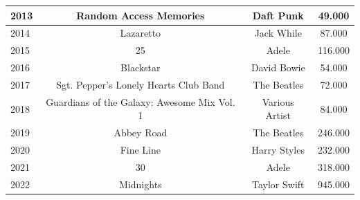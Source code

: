 \documentclass{article}
\begin{document}
\begin{table}[h]
{\begin{tabular}{|lccc|}
    \multicolumn{1}{|l|}{2013} & \multicolumn{1}{c|}{Random Access Memories}                      & \multicolumn{1}{c|}{Daft Punk}      & 49.000                                                             \\ \hline
    \multicolumn{1}{|l|}{2014} & \multicolumn{1}{c|}{Lazaretto}                                   & \multicolumn{1}{c|}{Jack While}     & 87.000                                                             \\ \hline
    \multicolumn{1}{|l|}{2015} & \multicolumn{1}{c|}{25}                                          & \multicolumn{1}{c|}{Adele}          & 116.000                                                            \\ \hline
    \multicolumn{1}{|l|}{2016} & \multicolumn{1}{c|}{Blackstar}                                   & \multicolumn{1}{c|}{David Bowie}    & 54.000                                                             \\ \hline
    \multicolumn{1}{|l|}{2017} & \multicolumn{1}{c|}{Sgt. Pepper's Lonely Hearts Club Band}       & \multicolumn{1}{c|}{The Beatles}    & 72.000                                                             \\ \hline
    \multicolumn{1}{|l|}{2018} & \multicolumn{1}{c|}{Guardians of the Galaxy: Awesome Mix Vol. 1} & \multicolumn{1}{c|}{Various Artist} & 84.000                                                             \\ \hline
    \multicolumn{1}{|l|}{2019} & \multicolumn{1}{c|}{Abbey Road}                                  & \multicolumn{1}{c|}{The Beatles}    & 246.000                                                            \\ \hline
    \multicolumn{1}{|l|}{2020} & \multicolumn{1}{c|}{Fine Line}                                   & \multicolumn{1}{c|}{Harry Styles}   & 232.000                                                            \\ \hline
    \multicolumn{1}{|l|}{2021} & \multicolumn{1}{c|}{30}                                          & \multicolumn{1}{c|}{Adele}          & 318.000                                                            \\ \hline
    \multicolumn{1}{|l|}{2022} & \multicolumn{1}{c|}{Midnights}                                   & \multicolumn{1}{c|}{Taylor Swift}   & 945.000                                                            \\ \hline
    \end{tabular}}
    \end{table}
\end{document}
